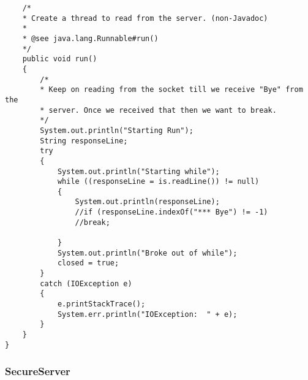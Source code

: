 \documentclass[12pt]{article}
\theoremstyle{plain}
\begin{document}
\begin{lstlisting}
	/*
	* Create a thread to read from the server. (non-Javadoc)
	*
	* @see java.lang.Runnable#run()
	*/
	public void run()
	{
		/*
		* Keep on reading from the socket till we receive "Bye" from the
		* server. Once we received that then we want to break.
		*/
		System.out.println("Starting Run");
		String responseLine;
		try
		{
			System.out.println("Starting while");
			while ((responseLine = is.readLine()) != null)
			{
				System.out.println(responseLine);
				//if (responseLine.indexOf("*** Bye") != -1)
				//break;

			}
			System.out.println("Broke out of while");
			closed = true;
		}
		catch (IOException e)
		{
			e.printStackTrace();
			System.err.println("IOException:  " + e);
		}
	}
}
\end{lstlisting}
\subsubsection{SecureServer}
\end{document}
